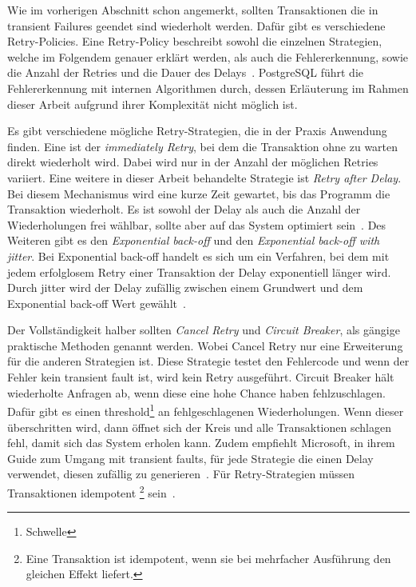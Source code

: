 
Wie im vorherigen Abschnitt schon angemerkt, sollten Transaktionen die in transient Failures geendet sind
wiederholt werden.
Dafür gibt es verschiedene Retry-Policies.
Eine Retry-Policy beschreibt sowohl die einzelnen Strategien, welche im Folgendem genauer erklärt werden, als auch
die Fehlererkennung, sowie die Anzahl der Retries und die Dauer des Delays~\cite{MicrosoftTransientFaults}.
PostgreSQL führt die Fehlererkennung mit internen Algorithmen durch, dessen Erläuterung im Rahmen dieser Arbeit
aufgrund ihrer Komplexität nicht möglich ist.

Es gibt verschiedene mögliche Retry-Strategien, die in der Praxis Anwendung finden.
Eine ist der \emph{immediately Retry}, bei dem die Transaktion ohne zu warten direkt wiederholt wird.
Dabei wird nur in der Anzahl der möglichen Retries variiert.
Eine weitere in dieser Arbeit behandelte Strategie ist \emph{Retry after Delay}.
Bei diesem Mechanismus wird eine kurze Zeit gewartet, bis das Programm die Transaktion wiederholt.
Es ist sowohl der Delay als auch die Anzahl der Wiederholungen frei wählbar, sollte aber auf das System optimiert
sein~\cite{MicrosoftRetryPattern}.
Des Weiteren gibt es den \emph{Exponential back-off} und den \emph{Exponential back-off with jitter}.
Bei Exponential back-off handelt es sich um ein Verfahren, bei dem mit jedem erfolglosem Retry einer Transaktion der
Delay exponentiell länger wird.
Durch jitter wird der Delay zufällig zwischen einem Grundwert und dem Exponential back-off Wert gewählt~\cite{MicrosoftTransientFaults}.

Der Vollständigkeit halber sollten \emph{Cancel Retry} und \emph{Circuit Breaker}, als gängige praktische Methoden
genannt werden.
Wobei Cancel Retry nur eine Erweiterung für die anderen Strategien ist.
Diese Strategie testet den Fehlercode und wenn der Fehler kein transient fault ist, wird kein Retry ausgeführt.
Circuit Breaker hält wiederholte Anfragen ab, wenn diese eine hohe Chance haben fehlzuschlagen.
Dafür gibt es einen threshold\footnote{Schwelle} an fehlgeschlagenen Wiederholungen.
Wenn dieser überschritten wird, dann öffnet sich der Kreis und alle Transaktionen schlagen fehl, damit sich das
System erholen kann.
Zudem empfiehlt Microsoft, in ihrem Guide zum Umgang mit transient faults, für jede Strategie die einen Delay
verwendet, diesen zufällig zu generieren~\cite{MicrosoftTransientFaults}.
Für Retry-Strategien müssen Transaktionen idempotent
\footnote{Eine Transaktion ist idempotent, wenn sie bei mehrfacher Ausführung
den gleichen Effekt liefert.} sein~\cite{MicrosoftRetryPattern}.
